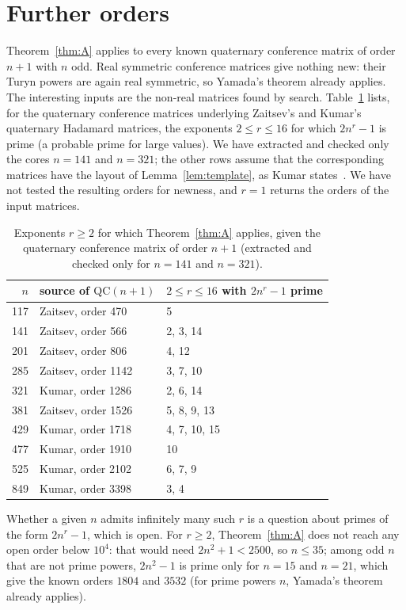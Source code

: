 \documentclass[10pt]{article}
\theoremstyle{remark}
\newcommand{\QC}{\mathrm{QC}}
\begin{document}
\section{Further orders}\label{sec:more}
Theorem~\ref{thm:A} applies to every known quaternary conference matrix of order $n+1$ with $n$ odd. Real symmetric conference matrices give nothing new: their Turyn powers are again real symmetric, so Yamada's theorem already applies. The interesting inputs are the non-real matrices found by search. Table~\ref{tab:more} lists, for the quaternary conference matrices underlying Zaitsev's and Kumar's quaternary Hadamard matrices, the exponents $2\le r\le16$ for which $2n^r-1$ is prime (a probable prime for large values). We have extracted and checked only the cores $n=141$ and $n=321$; the other rows assume that the corresponding matrices have the layout of Lemma~\ref{lem:template}, as Kumar states~\cite{Ku26}. We have not tested the resulting orders for newness, and $r=1$ returns the orders of the input matrices.

\begin{table}[h]
\centering
\begin{tabular}{rll}
\toprule
$n$ & source of $\QC(n+1)$ & $2\le r\le16$ with $2n^r-1$ prime\\
\midrule
117 & Zaitsev, order 470 & 5\\
141 & Zaitsev, order 566 & 2, 3, 14\\
201 & Zaitsev, order 806 & 4, 12\\
285 & Zaitsev, order 1142 & 3, 7, 10\\
321 & Kumar, order 1286 & 2, 6, 14\\
381 & Zaitsev, order 1526 & 5, 8, 9, 13\\
429 & Kumar, order 1718 & 4, 7, 10, 15\\
477 & Kumar, order 1910 & 10\\
525 & Kumar, order 2102 & 6, 7, 9\\
849 & Kumar, order 3398 & 3, 4\\
\bottomrule
\end{tabular}
\caption{Exponents $r\ge2$ for which Theorem~\ref{thm:A} applies, given the quaternary conference matrix of order $n+1$ (extracted and checked only for $n=141$ and $n=321$).}\label{tab:more}
\end{table}

Whether a given $n$ admits infinitely many such $r$ is a question about primes of the form $2n^r-1$, which is open. For $r\ge2$, Theorem~\ref{thm:A} does not reach any open order below $10^4$: that would need $2n^2+1<2500$, so $n\le35$; among odd $n$ that are not prime powers, $2n^2-1$ is prime only for $n=15$ and $n=21$, which give the known orders $1804$ and $3532$ (for prime powers $n$, Yamada's theorem already applies).
\end{document}
